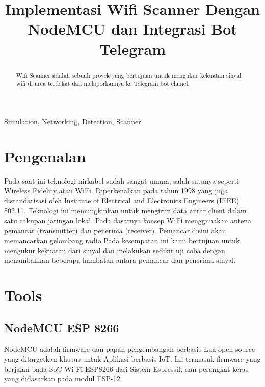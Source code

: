 \documentclass[conference]{IEEEtran}
\begin{document}
\title{Implementasi Wifi Scanner Dengan NodeMCU dan Integrasi Bot Telegram}

\author{
	\and
}
\maketitle

\begin{abstract}
	Wifi Scanner adalah sebuah proyek yang bertujuan untuk mengukur kekuatan sinyal wifi di area terdekat dan melaporkannya ke Telegram bot chanel.
\end{abstract}

\begin{IEEEkeywords}
	Simulation, Networking, Detection, Scanner
\end{IEEEkeywords}

\section{Pengenalan}
Pada saat ini teknologi nirkabel sudah sangat umum, salah satunya seperti Wireless Fidelity atau WiFi. Diperkenalkan pada tahun 1998 yang juga distandarisasi oleh Institute of Electrical and Electronics Engineers (IEEE) 802.11. Teknologi ini memungkinkan untuk mengirim data antar client dalam satu cakupan jaringan lokal. Pada dasarnya konsep WiFi menggunakan antena pemancar (transmitter) dan penerima (receiver). Pemancar disini akan memancarkan gelombang radio Pada kesempatan ini kami bertujuan untuk mengukur kekuatan dari sinyal dan melakukan sedikit uji coba dengan menambahkan beberapa hambatan antara pemancar dan penerima sinyal.

\section{Tools}\label{teori-tool}

\subsection{NodeMCU ESP 8266}
NodeMCU adalah firmware dan papan pengembangan berbasis Lua open-source yang ditargetkan khusus untuk Aplikasi berbasis IoT. Ini termasuk firmware yang berjalan pada SoC Wi-Fi ESP8266 dari Sistem Espressif, dan perangkat keras yang didasarkan pada modul ESP-12.
\end{document}
